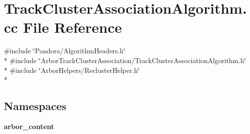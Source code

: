 \section{Track\+Cluster\+Association\+Algorithm.\+cc File Reference}
\label{TrackClusterAssociationAlgorithm_8cc}
{\ttfamily \#include \char`\"{}Pandora/\+Algorithm\+Headers.\+h\char`\"{}}\\*
{\ttfamily \#include \char`\"{}Arbor\+Track\+Cluster\+Association/\+Track\+Cluster\+Association\+Algorithm.\+h\char`\"{}}\\*
{\ttfamily \#include \char`\"{}Arbor\+Helpers/\+Recluster\+Helper.\+h\char`\"{}}\\*
\subsection*{Namespaces}
\begin{DoxyCompactItemize}
\item 
 {\bf arbor\+\_\+content}
\end{DoxyCompactItemize}
